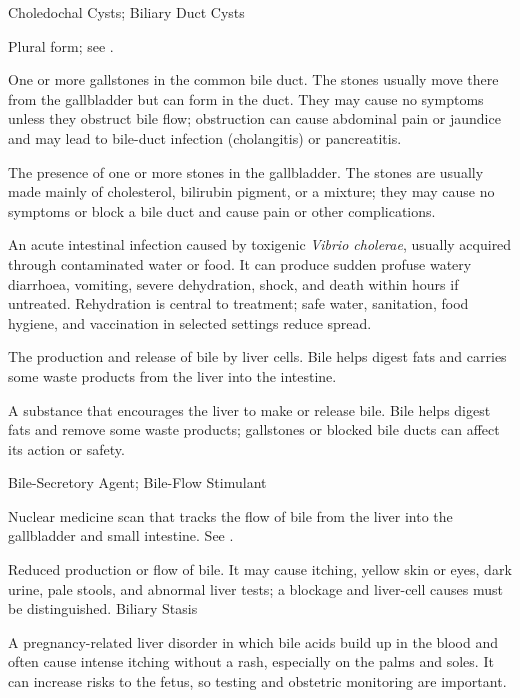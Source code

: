 \synonyms
Choledochal Cysts; Biliary Duct Cysts

 Plural form; see .

 One or more gallstones in the common bile duct. The stones usually move there from the gallbladder but can form in the duct. They may cause no symptoms unless they obstruct bile flow; obstruction can cause abdominal pain or jaundice and may lead to bile-duct infection (cholangitis) or pancreatitis.

 The presence of one or more stones in the gallbladder. The stones are usually made mainly of cholesterol, bilirubin pigment, or a mixture; they may cause no symptoms or block a bile duct and cause pain or other complications.

 An acute intestinal infection caused by toxigenic \textit{Vibrio cholerae}, usually acquired through contaminated water or food. It can produce sudden profuse watery diarrhoea, vomiting, severe dehydration, shock, and death within hours if untreated. Rehydration is central to treatment; safe water, sanitation, food hygiene, and vaccination in selected settings reduce spread.

 The production and release of bile by liver cells. Bile helps digest fats and carries some waste products from the liver into the intestine.

 A substance that encourages the liver to make or release bile. Bile helps digest fats and remove some waste products; gallstones or blocked bile ducts can affect its action or safety.

\synonyms
Bile-Secretory Agent; Bile-Flow Stimulant

 Nuclear medicine scan that tracks the flow of bile from the liver into the gallbladder and small intestine. See .

 Reduced production or flow of bile. It may cause itching, yellow skin or eyes, dark urine, pale stools, and abnormal liver tests; a blockage and liver-cell causes must be distinguished.
\synonyms
Biliary Stasis

 A pregnancy-related liver disorder in which bile acids build up in the blood and often cause intense itching without a rash, especially on the palms and soles. It can increase risks to the fetus, so testing and obstetric monitoring are important.

